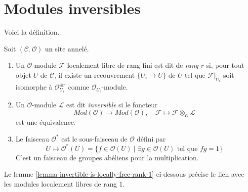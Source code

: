 \section{Modules inversibles}

\label{section-invertible}

\noindent
Voici la définition.

\begin{definition}

\label{definition-invertible-sheaf}

Soit $(\mathcal{C}, \mathcal{O})$ un site annelé.

\begin{enumerate}

\item Un $\mathcal{O}$-module $\mathcal{F}$ localement libre de rang fini
est dit de {\it rang $r$} si, pour tout objet $U$ de $\mathcal{C}$, il
existe un recouvrement $\{U_i \to U\}$ de $U$ tel que
$\mathcal{F}|_{U_i}$ soit isomorphe à
$\mathcal{O}_{U_i}^{\oplus r}$ comme $\mathcal{O}_{U_i}$-module.
\item Un $\mathcal{O}$-module $\mathcal{L}$ est dit {\it inversible}
si le foncteur
$$
\textit{Mod}(\mathcal{O}) \longrightarrow \textit{Mod}(\mathcal{O}),\quad
\mathcal{F}  \longmapsto \mathcal{F} \otimes_\mathcal{O} \mathcal{L}
$$
est une équivalence.
\item Le faisceau {\it $\mathcal{O}^*$} est le sous-faisceau de
$\mathcal{O}$ défini par
$$
U \longmapsto \mathcal{O}^*(U) = \{f \in \mathcal{O}(U) \mid
\exists g \in \mathcal{O}(U)\text{ tel que }fg = 1\}
$$
C'est un faisceau de groupes abéliens pour la multiplication.

\end{enumerate}

\end{definition}

\noindent
Le lemme \ref{lemma-invertible-is-locally-free-rank-1} ci-dessous précise
le lien avec les modules localement libres de rang $1$.

